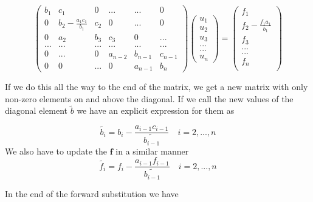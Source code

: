 \documentclass[a4paper,11pt]{article}
\begin{document}
{\begin{equation}
\begin{pmatrix}
b_1 & c_1 & 0 & ... & ... & 0 \\
0 & b_2-\frac{a_1 c_1}{b_1} & c_2 & 0 & ... & 0 \\
0 & a_2 & b_3 & c_3 & 0 & ... \\
... & ... & ... & ... & ... & ... \\
0 & ... & 0 & a_{n-2} & b_{n-1} & c_{n-1} \\
0 & 0 & ... & 0 & a_{n-1} & b_{n} 
\end{pmatrix} \begin{pmatrix}
u_1\\
u_2\\
u_3\\
...\\
...\\
u_n
\end{pmatrix} = \begin{pmatrix}
f_1 \\
f_2-\frac{f_1 a_1}{b_1} \\
f_3 \\
... \\
... \\
f_n \\
\end{pmatrix}
\end{equation}
		
If we do this all the way to the end of the matrix, we get a new matrix with only non-zero elements on and above the diagonal. If we call the new values of the diagonal element $\tilde{b}$ we have an explicit expression for them as
		
\begin{equation}
\tilde{b_i}=b_{i}-\frac{a_{i-1}c_{i-1}}{\tilde{b_{i-1}}}\quad i = 2, ..., n
\label{eq:forward_general_b}
\end{equation}
We also have to update the $\mathbf{f}$ in a similar manner
\begin{equation}
\tilde{f_i}=f_{i}-\frac{a_{i-1}f_{i-1}}{\tilde{b_{i-1}}}\quad i = 2, ..., n
\label{eq:forward_general_f}
\end{equation}
		
In the end of the forward substitution we have
		
}
\end{document}
